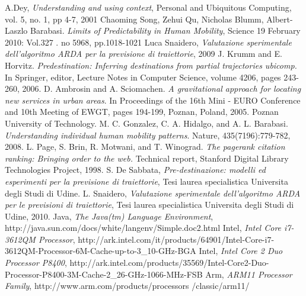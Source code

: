 \begin{thebibliography}{999}
 A.Dey, \textit{Understanding and using context}, Personal and Ubiquitous Computing, vol. 5, no. 1, pp 4-7, 2001
 Chaoming Song, Zehui Qu, Nicholas Blumm, Albert-Laszlo Barabasi. \textit{Limits of Predictability in Human Mobility}, Science 19 February 2010: Vol.327 . no 5968, pp.1018-1021
 Luca Snaidero, \textit{Valutazione sperimentale dell'algoritmo ARDA per la previsione di traiettorie}, 2009
 J. Krumm and E. Horvitz. \textit{Predestination: Inferring destinations from partial trajectories ubicomp.} In Springer, editor, Lecture Notes in Computer Science, volume 4206, pages 243-260, 2006.
 D. Ambrosin and A. Sciomachen. \textit{A gravitational approach for locating new services in urban areas}. In Proceedings of the 16th Mini - EURO Conference and 10th Meeting of EWGT, pages 194-199, Poznan, Poland, 2005. Poznan University of Technology.
 M. C. Gonzalez, C. A. Hidalgo, and A. L. Barabasi. \textit{Understanding individual human mobility patterns}. Nature, 435(7196):779-782, 2008.
 L. Page, S. Brin, R. Motwani, and T. Winograd. \textit{The pagerank citation ranking: Bringing order to the web.} Technical report, Stanford Digital Library Technologies Project, 1998.
 S. De Sabbata, \textit{Pre-destinazione: modelli ed esperimenti per la previsione di traiettorie}, Tesi laurea specialistica Universita degli Studi di Udine.
 L. Snaidero, \textit{Valutazione sperimentale dell'algoritmo ARDA per le previsioni di traiettorie}, Tesi laurea specialistica Universita degli Studi di Udine, 2010.
 Java, \textit{The Java(tm) Language Environment}, http://java.sun.com/docs/white/langenv/Simple.doc2.html
 Intel, \textit{Intel Core i7-3612QM Processor}, http://ark.intel.com/it/products/64901/Intel-Core-i7-3612QM-Processor-6M-Cache-up-to-3\_10-GHz-BGA
 Intel, \textit{Intel Core 2 Duo Processor P8400}, http://ark.intel.com/products/35569/Intel-Core2-Duo-Processor-P8400-3M-Cache-2\_26-GHz-1066-MHz-FSB
 Arm, \textit{ARM11 Processor Family}, http://www.arm.com/products/processors /classic/arm11/
\end{thebibliography}
